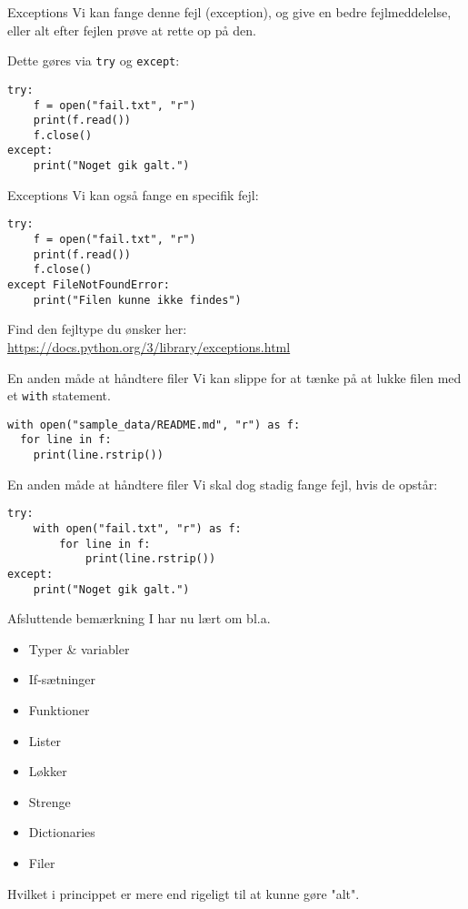 \begin{frame}[fragile]{Exceptions}
	Vi kan fange denne fejl (exception), og give en bedre fejlmeddelelse, eller alt efter fejlen prøve at rette op på den.
	
	Dette gøres via \texttt{try} og \texttt{except}:
	\begin{lstlisting}[style=python]
try:
	f = open("fail.txt", "r")
	print(f.read())
	f.close()
except:
	print("Noget gik galt.")
	\end{lstlisting}
\end{frame}

\begin{frame}[fragile]{Exceptions}
	Vi kan også fange en specifik fejl:
	\begin{lstlisting}[style=python]
try:
	f = open("fail.txt", "r")
	print(f.read())
	f.close()
except FileNotFoundError:
	print("Filen kunne ikke findes")
	\end{lstlisting}

\pause

Find den fejltype du ønsker her: 
\url{https://docs.python.org/3/library/exceptions.html}
\end{frame}


\begin{frame}[fragile]{En anden måde at håndtere filer}
Vi kan slippe for at tænke på at lukke filen med et \texttt{with} statement.

\begin{lstlisting}[style=python]
with open("sample_data/README.md", "r") as f:
  for line in f:
    print(line.rstrip())
\end{lstlisting}

\end{frame}

\begin{frame}[fragile]{En anden måde at håndtere filer}
Vi skal dog stadig fange fejl, hvis de opstår:

\begin{lstlisting}[style=python]
try:
	with open("fail.txt", "r") as f:
		for line in f:
			print(line.rstrip())
except:
	print("Noget gik galt.")
\end{lstlisting}

\end{frame}


\begin{frame}[fragile]{Afsluttende bemærkning}
I har nu lært om bl.a.
\begin{itemize}
	\item Typer \& variabler
	\item If-sætninger
	\item Funktioner
	\item Lister
	\item Løkker
	\item Strenge
	\item Dictionaries
	\item Filer
\end{itemize}

Hvilket i princippet er mere end rigeligt til at kunne gøre "alt".


\end{frame}



